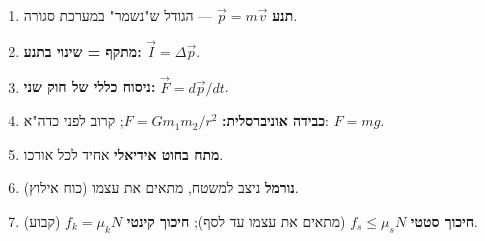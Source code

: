 \documentclass[12pt, a4paper]{article}
\newcommand{\hvec}[1]{\overrightarrow{#1}}
\begin{document}
\begin{tcolorbox}[warnbox, title={נקודות מפתח לזכור}]
\begin{enumerate}
  \item \textbf{תנע} \textenglish{$\hvec{p} = m\hvec{v}$} --- הגודל ש"נשמר" במערכת סגורה.
  \item \textbf{מתקף = שינוי בתנע:} \textenglish{$\hvec{I} = \Delta\hvec{p}$}.
  \item \textbf{ניסוח כללי של חוק שני:} \textenglish{$\hvec{F} = d\hvec{p}/dt$}.
  \item \textbf{כבידה אוניברסלית:} \textenglish{$F = Gm_1 m_2/r^2$}; קרוב לפני כדה"א: \textenglish{$F = mg$}.
  \item \textbf{מתח בחוט אידיאלי} אחיד לכל אורכו.
  \item \textbf{נורמל} ניצב למשטח, מתאים את עצמו (כוח אילוץ).
  \item \textbf{חיכוך סטטי} \textenglish{$f_s \le \mu_s N$} (מתאים את עצמו עד לסף); \textbf{חיכוך קינטי} \textenglish{$f_k = \mu_k N$} (קבוע).
\end{enumerate}
\end{tcolorbox}
\end{document}
